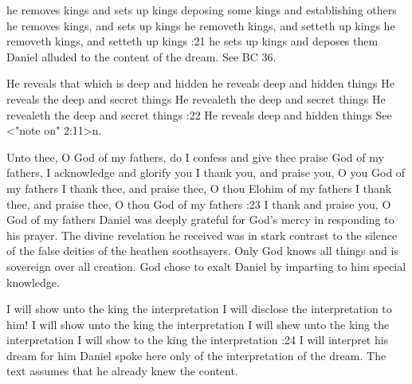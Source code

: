     {he removes kings and sets up kings} %
    {deposing some kings and establishing others} %
    {he removes kings, and sets up kings} %
    {he removeth kings, and setteth up kings} %
    {he removeth kings, and setteth up kings} %
:21 {he sets up kings and deposes them} Daniel alluded to  the 
content of the dream. See BC 36.



    {He reveals that which is deep and hidden} %
    {he reveals deep and hidden things} %
    {He reveals the deep and secret things} %
    {He revealeth the deep and secret things} %
    {He revealeth the deep and secret things} %
:22 {He reveals deep and hidden things} See <"note on" 2:11>n.

    {Unto thee, O God of my fathers, do I confess and give thee praise} %
    {God of my fathers, I acknowledge and glorify you} %
    {I thank you, and praise you, O you God of my fathers} %
    {I thank thee, and praise thee, O thou Elohim of my fathers} %
    {I thank thee, and praise thee, O thou God of my fathers} %
:23 {I thank and praise you, O God of my fathers} Daniel was
deeply grateful for God's mercy in responding to his prayer. The 
divine revelation he received was in stark contrast to the silence of
the false deities of the heathen soothsayers. Only God knows all
things and is sovereign over all creation. God chose to exalt Daniel 
by imparting to him special knowledge.

    {I will show unto the king the interpretation} %
    {I will disclose the interpretation to him!} %
    {I will show unto the king the interpretation} %
    {I will shew unto the king the interpretation} %
    {I will show to the king the interpretation} %
:24 {I will interpret his dream for him} Daniel spoke here only 
of the interpretation of the dream. The text assumes that he already 
knew the content.


